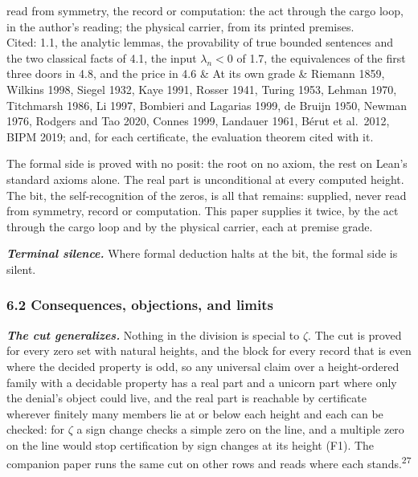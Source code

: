 \documentclass[10pt]{article}
\newenvironment{jbox}[2]{\par\vspace{7pt}\noindent{\color{accent}\rule{\linewidth}{0.8pt}}\par\nopagebreak[4]\vspace{1pt}%
  \noindent{\small\bfseries{\color{accent}Box #1}\enspace\textbar\enspace{\color{deep}#2}}\par\nopagebreak[4]\vspace{2pt}\small\setlength{\parindent}{0pt}\setlength{\parskip}{3pt}}%
  {\par\vspace{2pt}\noindent{\color{accent!45}\rule{\linewidth}{0.4pt}}\par\vspace{7pt}}
\begin{document}
\begin{longtable}[]
read from symmetry, the record or computation: the act through the cargo
loop, in the author's reading; the physical carrier, from its printed
premises. \\
Cited: 1.1, the analytic lemmas, the provability of true bounded
sentences and the two classical facts of 4.1, the input
\(\lambda_n < 0\) of 1.7, the equivalences of the first three doors in
4.8, and the price in 4.6 & At its own grade & Riemann 1859, Wilkins
1998, Siegel 1932, Kaye 1991, Rosser 1941, Turing 1953, Lehman 1970,
Titchmarsh 1986, Li 1997, Bombieri and Lagarias 1999, de Bruijn 1950,
Newman 1976, Rodgers and Tao 2020, Connes 1999, Landauer 1961, Bérut et
al.~2012, BIPM 2019; and, for each certificate, the evaluation theorem
cited with it. \\
\end{longtable}

\begin{jbox}{5}{The guard sentence, as the paper prints it}

The formal side is proved with no posit: the root on no axiom, the rest
on Lean's standard axioms alone. The real part is unconditional at every
computed height. The bit, the self-recognition of the zeros, is all that
remains: supplied, never read from symmetry, record or computation. This
paper supplies it twice, by the act through the cargo loop and by the
physical carrier, each at premise grade.

\end{jbox}

\textbf{\emph{Terminal silence.}} Where formal deduction halts at the
bit, the formal side is silent.

\hypertarget{consequences-objections-and-limits}{%
\subsubsection{6.2 Consequences, objections, and
limits}\label{consequences-objections-and-limits}}

\textbf{\emph{The cut generalizes.}} Nothing in the division is special
to \(\zeta\). The cut is proved for every zero set with natural heights,
and the block for every record that is even where the decided property
is odd, so any universal claim over a height-ordered family with a
decidable property has a real part and a unicorn part where only the
denial's object could live, and the real part is reachable by
certificate wherever finitely many members lie at or below each height
and each can be checked: for \(\zeta\) a sign change checks a simple
zero on the line, and a multiple zero on the line would stop
certification by sign changes at its height (F1). The companion paper
runs the same cut on other rows and reads where each
stands.\textsuperscript{27}
\end{document}
